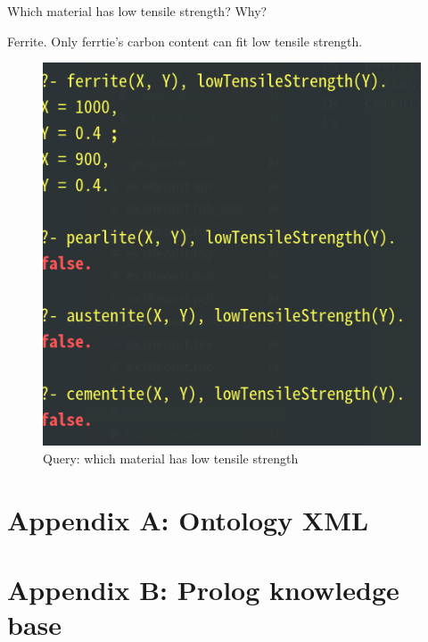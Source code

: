 \documentclass[12pt]{article}
\begin{document}
{\begin{enumerate}[1.]
	Which material has low tensile strength? Why?

	Ferrite. Only ferrtie's carbon content can fit low tensile strength.

	\begin{figure}[ht]
		\centering
		\includegraphics[scale=0.3]{figs/ex9-3-3.png}
		\caption{Query: which material has low tensile strength}
		\label{fig:label15}
	\end{figure}

\end{enumerate}

\newpage
\section{Appendix A: Ontology XML}
\label{sec: AppendixA}
\lstset{basicstyle=\tiny}


\newpage
\section{Appendix B: Prolog knowledge base}
\label{sec: AppendixB}
\lstset{basicstyle=\normalsize}




}
\end{document}
